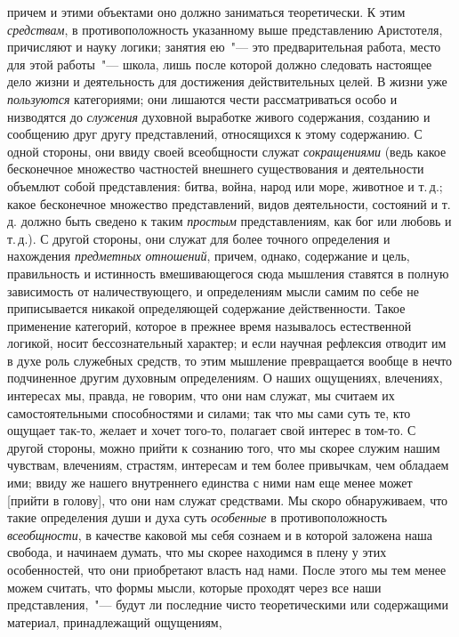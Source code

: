 причем и этими объектами оно должно заниматься теоретически.
К этим \emph{средствам}, в противоположность указанному
выше представлению Аристотеля, причисляют и науку
логики; занятия ею~"--- это предварительная работа,
место для этой работы~"--- школа, лишь после которой
должно следовать настоящее дело жизни и деятельность
для достижения действительных целей. В жизни уже
\emph{пользуются} категориями; они лишаются чести рассматриваться
особо и низводятся до \emph{служения} духовной выработке
живого содержания, созданию и сообщению друг
другу представлений, относящихся к этому содержанию.
С одной стороны, они ввиду своей всеобщности служат
\emph{сокращениями} (ведь какое бесконечное множество частностей
внешнего существования и деятельности объемлют
собой представления: битва, война, народ или море, животное
и т.\,д.; какое бесконечное множество представлений,
видов деятельности, состояний и т.\,д. должно быть
сведено к таким \emph{простым} представлениям, как бог или
любовь и т.\,д.). С другой стороны, они служат для более
точного определения и нахождения \emph{предметных отношений},
причем, однако, содержание и цель, правильность
и истинность вмешивающегося сюда мышления ставятся
в полную зависимость от наличествующего, и определениям
мысли самим по себе не приписывается никакой
определяющей содержание действенности. Такое применение
категорий, которое в прежнее время называлось
естественной логикой, носит бессознательный характер;
и если научная рефлексия отводит им в духе роль служебных
средств, то этим мышление превращается вообще
в нечто подчиненное другим духовным определениям.
О наших ощущениях, влечениях, интересах мы, правда,
не говорим, что они нам служат, мы считаем их самостоятельными
способностями и силами; так что мы сами
суть те, кто ощущает так-то, желает и хочет того-то,
полагает свой интерес в том-то. С другой стороны, можно
прийти к сознанию того, что мы скорее служим нашим
чувствам, влечениям, страстям, интересам и тем более
привычкам, чем обладаем ими; ввиду же нашего внутреннего
единства с ними нам еще менее может [прийти в голову],
что они нам служат средствами. Мы скоро обнаруживаем,
что такие определения души и духа суть \emph{особенные}
в противоположность \emph{всеобщности}, в качестве каковой
мы себя сознаем и в которой заложена наша свобода,
и начинаем думать, что мы скорее находимся в плену у
этих особенностей, что они приобретают власть над нами.
После этого мы тем менее можем считать, что формы
мысли, которые проходят через все наши представления,~"---
будут ли последние чисто теоретическими или
содержащими материал, принадлежащий ощущениям,
